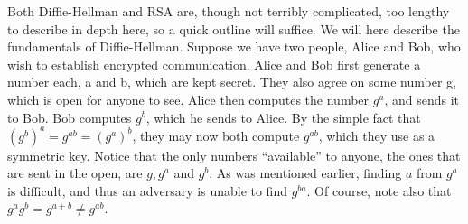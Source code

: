 \documentclass[conference]{IEEEtran}
\begin{document}
Both Diffie-Hellman and RSA are, though not terribly complicated, too lengthy to describe in depth here, so a quick outline will suffice.
We will here describe the fundamentals of Diffie-Hellman\cite{diffieHellman}.
Suppose we have two people, Alice and Bob, who wish to establish encrypted communication.
Alice and Bob first generate a number each, a and b, which are kept secret.
They also agree on some number g, which is open for anyone to see.
Alice then computes the number $g^a$, and sends it to Bob.
Bob computes $g^b$, which he sends to Alice.
By the simple fact that $(g^b)^a = g^{ab} = (g^a)^b$, they may now both compute $g^{ab}$, which they use as a symmetric key.
Notice that the only numbers ``available'' to anyone, the ones that are sent in the open, are $g, g^a$ and $g^b$.
As was mentioned earlier, finding $a$ from $g^a$ is difficult, and thus an adversary is unable to find $g^{ba}$.
Of course, note also that $g^a g^b = g^{a+b}\neq g^{ab}$.

\end{document}
